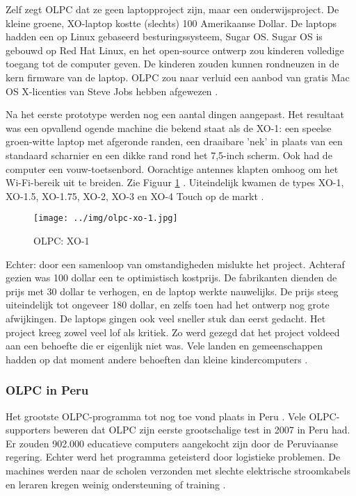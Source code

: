 Zelf zegt OLPC dat ze geen laptopproject zijn, maar een onderwijsproject. De kleine groene, XO-laptop kostte (slechts) 100 Amerikaanse Dollar. De laptops hadden een op Linux gebaseerd besturingssysteem, Sugar OS. Sugar OS is gebouwd op Red Hat Linux, en het open-source ontwerp zou kinderen volledige toegang tot de computer geven. De kinderen zouden kunnen rondneuzen in de kern firmware van de laptop. OLPC zou naar verluid een aanbod van gratis Mac OS X-licenties van Steve Jobs hebben afgewezen \autocite{Robertson2018}.

Na het eerste prototype werden nog een aantal dingen aangepast. Het resultaat was een opvallend ogende machine die bekend staat als de XO-1: een speelse groen-witte laptop met afgeronde randen, een draaibare 'nek' in plaats van een standaard scharnier en een dikke rand rond het 7,5-inch scherm. Ook had de computer een vouw-toetsenbord. Oorachtige antennes klapten omhoog om het Wi-Fi-bereik uit te breiden. Zie Figuur \ref{xo-1} \autocite{Robertson2018}. Uiteindelijk kwamen de types XO-1, XO-1.5, XO-1.75, XO-2, XO-3 en XO-4 Touch op de markt \autocite{OLPC2016}.

 \begin{figure}[h!]
	\texttt{[image: ../img/olpc-xo-1.jpg]}
	\caption{OLPC: XO-1} \autocite{OneLaptopPerChild2005}
	\label{xo-1}
\end{figure}

Echter: door een samenloop van omstandigheden mislukte het project. Achteraf gezien was 100 dollar een te optimistisch kostprijs. De fabrikanten dienden de prijs met 30 dollar te verhogen, en de laptop werkte nauwelijks. De prijs steeg uiteindelijk tot ongeveer 180 dollar, en zelfs toen had het ontwerp nog grote afwijkingen. De laptops gingen ook veel sneller stuk dan eerst gedacht. Het project kreeg zowel veel lof als kritiek. Zo werd gezegd dat het project voldeed aan een behoefte die er eigenlijk niet was. Vele landen en gemeenschappen hadden op dat moment andere behoeften dan kleine kindercomputers \autocite{Robertson2018}.

\subsubsection{OLPC in Peru}
\label{olpc-in-peru}
Het grootste OLPC-programma tot nog toe vond plaats in Peru  \autocite{Trucano2012}. Vele OLPC-supporters beweren dat OLPC zijn eerste grootschalige test in 2007 in Peru had. Er zouden 902.000 educatieve computers aangekocht zijn door de Peruviaanse regering. Echter werd het programma geteisterd door logistieke problemen. De machines werden naar de scholen verzonden met slechte elektrische stroomkabels en leraren kregen weinig ondersteuning of training \autocite{Robertson2018}.

